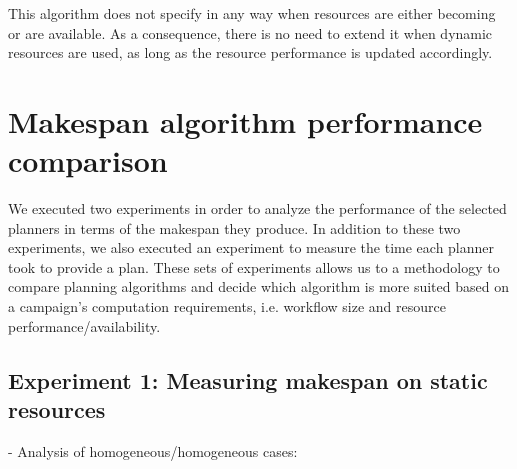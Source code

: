 This algorithm does not specify in any way when resources are either becoming or are available.
As a consequence, there is no need to extend it when dynamic resources are used, as long as the resource performance is updated accordingly.

\section{Makespan algorithm performance comparison}
\label{sec:algo_perf_comp}

We executed two experiments in order to analyze the performance of the selected planners in terms of the makespan they produce.
In addition to these two experiments, we also executed an experiment to measure the time each planner took to provide a plan.
These sets of experiments allows us to a methodology to compare planning algorithms and decide which algorithm is more suited based on a campaign's computation requirements, i.e. workflow size and resource performance/availability.

\subsection{Experiment 1: Measuring  makespan on static resources}

- Analysis of homogeneous/homogeneous cases:

